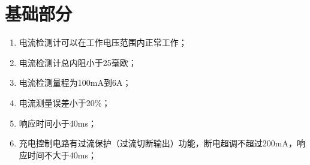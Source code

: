
\section{基础部分}
\begin{enumerate}
    \item 电流检测计可以在工作电压范围内正常工作；
    \item 电流检测计总内阻小于25毫欧；
    \item 电流检测量程为100mA到6A；
    \item 电流测量误差小于20\%；
    \item 响应时间小于40ms；
    \item 充电控制电路有过流保护（过流切断输出）功能，断电超调不超过200mA，响应时间不大于40ms；
\end{enumerate}
